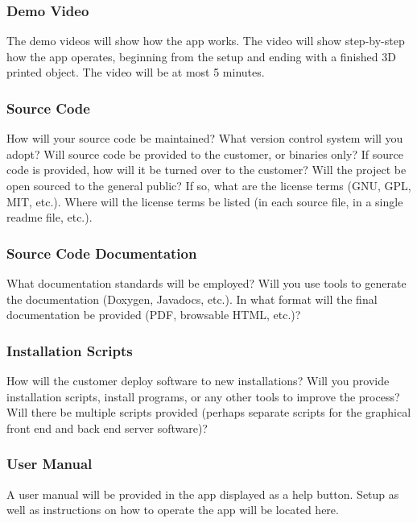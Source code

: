 \subsubsection{Demo Video}
The demo videos will show how the app works. The video will show step-by-step how the app operates, beginning from the setup and ending with a finished 3D printed object. The video will be at most 5 minutes.

\subsubsection{Source Code}
How will your source code be maintained? What version control system will you adopt? Will source code be provided to the customer, or binaries only? If source code is provided, how will it be turned over to the customer? Will the project be open sourced to the general public? If so, what are the license terms (GNU, GPL, MIT, etc.). Where will the license terms be listed (in each source file, in a single readme file, etc.).

\subsubsection{Source Code Documentation}
What documentation standards will be employed? Will you use tools to generate the documentation (Doxygen, Javadocs, etc.). In what format will the final documentation be provided (PDF, browsable HTML, etc.)?

\subsubsection{Installation Scripts}
How will the customer deploy software to new installations? Will you provide installation scripts, install programs, or any other tools to improve the process? Will there be multiple scripts provided (perhaps separate scripts for the graphical front end and back end server software)? 

\subsubsection{User Manual}
A user manual will be provided in the app displayed as a help button. Setup as well as instructions on how to operate the app will be located here.
